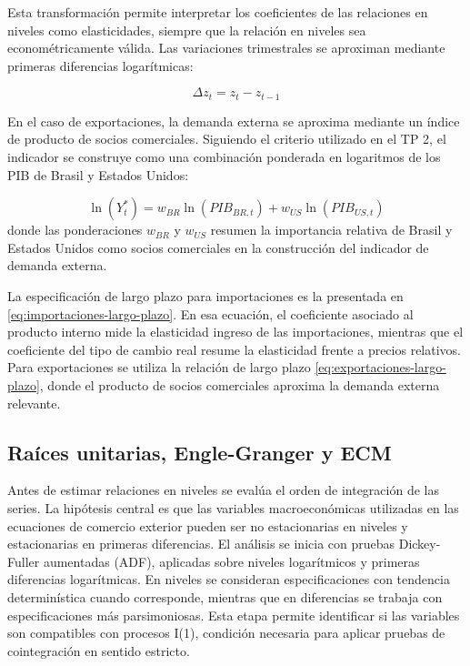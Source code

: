 \documentclass[11pt,a4paper]{article}
\begin{document}
	Esta transformación permite interpretar los coeficientes de las relaciones en
	niveles como elasticidades, siempre que la relación en niveles sea
	econométricamente válida. Las variaciones trimestrales se aproximan mediante
	primeras diferencias logarítmicas:

	\begin{equation}
		\Delta z_t = z_t - z_{t-1}
		\label{eq:diferencia-logaritmica}
	\end{equation}

	En el caso de exportaciones, la demanda externa se aproxima mediante un índice
	de producto de socios comerciales. Siguiendo el criterio utilizado en el TP 2,
	el indicador se construye como una combinación ponderada en logaritmos de los
	PIB de Brasil y Estados Unidos:

	\begin{equation}
		\ln(Y_t^*)
		= w_{BR}\ln(PIB_{BR,t}) + w_{US}\ln(PIB_{US,t})
		\label{eq:tp3-pib-socios}
	\end{equation}
	donde las ponderaciones \(w_{BR}\) y \(w_{US}\) resumen la importancia relativa
	de Brasil y Estados Unidos como socios comerciales en la construcción del
	indicador de demanda externa.

	La especificación de largo plazo para importaciones es la presentada en
	\eqref{eq:importaciones-largo-plazo}. En esa ecuación, el coeficiente asociado
	al producto interno mide la elasticidad ingreso de las importaciones, mientras
	que el coeficiente del tipo de cambio real resume la elasticidad frente a
	precios relativos. Para exportaciones se utiliza la relación de largo plazo
	\eqref{eq:exportaciones-largo-plazo}, donde el producto de socios comerciales
	aproxima la demanda externa relevante.

	\subsection{Raíces unitarias, Engle-Granger y ECM}
	\label{subsec:metodologia-engle-granger}

	Antes de estimar relaciones en niveles se evalúa el orden de integración de las
	series. La hipótesis central es que las variables macroeconómicas utilizadas en
	las ecuaciones de comercio exterior pueden ser no estacionarias en niveles y
	estacionarias en primeras diferencias. El análisis se inicia con pruebas
	Dickey-Fuller aumentadas (ADF), aplicadas sobre niveles logarítmicos y primeras
	diferencias logarítmicas. En niveles se consideran especificaciones con
	tendencia determinística cuando corresponde, mientras que en diferencias se
	trabaja con especificaciones más parsimoniosas. Esta etapa permite identificar
	si las variables son compatibles con procesos I(1), condición necesaria para
	aplicar pruebas de cointegración en sentido estricto.
\end{document}
